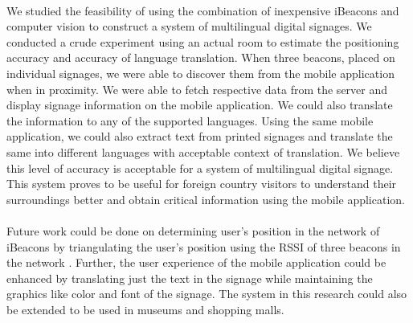 \documentclass[12pt]{article}
\begin{document}
\paragraph{}We studied the feasibility of using the combination of inexpensive iBeacons and computer vision to construct a system of multilingual digital signages. We conducted a crude experiment using an actual room to estimate the positioning accuracy and accuracy of language translation. When three beacons, placed on individual signages, we were able to discover them from the mobile application when in proximity. We were able to fetch respective data from the server and display signage information on the mobile application. We could also translate the information to any of the supported languages. Using the same mobile application, we could also extract text from printed signages and translate the same into different languages with acceptable context of translation. We believe this level of accuracy is acceptable for a system of multilingual digital signage. This system proves to be useful for foreign country visitors to understand their surroundings better and obtain critical information using the mobile application. 

%

\paragraph{}Future work could be done on determining user's position in the network of iBeacons by triangulating the user's position using the RSSI of three beacons in the network . Further, the user experience of the mobile application could be enhanced by translating just the text in the signage while maintaining the graphics like color and font of the signage. The system in this research could also be extended to be used in museums and shopping malls.

%


\cleardoublepage
{}


\end{document}
